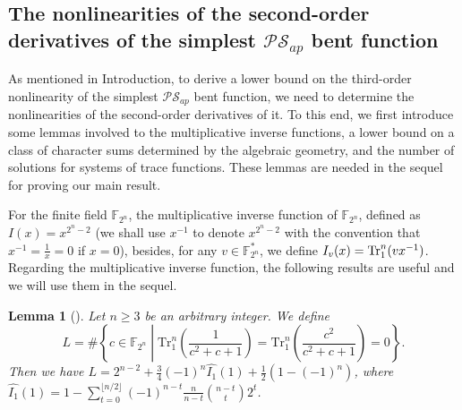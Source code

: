 \documentclass{article}
\newcommand{\F}{\mathbb{F}}
\newcommand{\0}{\textbf{0}}
\newcommand{\1}{\textbf{1}}
\theoremstyle{plain}
\newtheorem{lemma}{Lemma}
\begin{document}
    \subsection{The nonlinearities of the second-order derivatives of the simplest $\mathcal{PS}_{ap}$ bent function}
    As mentioned in Introduction, to derive a lower bound on the third-order nonlinearity of the simplest $\mathcal{PS}_{ap}$ bent function, 
    we need to determine the nonlinearities of the second-order derivatives of it.
    To this end, we first introduce some lemmas involved to the multiplicative inverse functions,
    a lower bound on a class of character sums determined by the algebraic geometry,
    and the number of solutions for systems of trace functions.
    These lemmas are needed in the sequel for proving our main result.
  
    For the finite field $\F_{2^n}$, the multiplicative inverse function of $\F_{2^n}$, defined as $I(x)=x^{2^n-2}$ (we shall use $x^{-1}$ to denote $x^{2^n-2}$ with the convention that $x^{-1}=\frac{1}{x}=0$ if $x=0$), besides, for any $v\in\F_{2^n}^*$, we define $I_v(x)=\Tr_1^n(vx^{-1})$. 
    Regarding the multiplicative inverse function, the following results are useful and we will use them in the sequel. 

    \begin{lemma}[\cite{tang2022invfunc}]\label{L:SumInv00}
        Let $n\geq 3$ be an arbitrary integer.
        We define
        $$L=\#\left\{c\in\F_{2^n} \middle| \mathrm{Tr}_1^n\left(\frac{1}{c^2+c+1}\right)=\mathrm{Tr}_1^n\left(\frac{c^2}{c^2+c+1}\right)=0\right\}.$$
        Then we have $L=2^{n-2}+\frac{3}{4}(-1)^n\widehat{I_1}(1)+\frac{1}{2}\left(1-(-1)^n\right)$, where $\widehat{I_1}(1)=1-\sum_{t=0}^{\lfloor n/2\rfloor}(-1)^{n-t}\frac{n}{n-t}{{n-t}\choose {t}}2^t$.
    \end{lemma}

\end{document}
